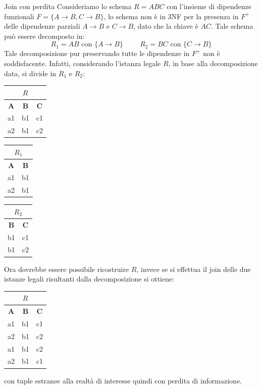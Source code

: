 \begin{Example}{Join con perdita}{}
    Consideriamo lo schema $R=ABC$ con l'insieme di dipendenze funzionali $F=\{A\to B, C\to B\}$, lo schema non è in 3NF per la presenza in $F^+$ delle dipendenze parziali $A\to B$ e $C\to B$, dato che la chiave è $AC$. Tale schema può essere decomposto in:
    \begin{equation*}
        R_1=AB\mbox{ con }\{A\to B\}\hspace{1cm}R_2=BC\mbox{ con }\{C\to B\}
    \end{equation*}
    Tale decomposizione pur preservando tutte le dipendenze in $F^+$ non è soddisfacente. Infatti, considerando l'istanza legale $R$, in base alla decomposizione data, si divide in $R_1$ e $R_2$:
     \begin{center}
        \begin{tabular}{|c|c|c|}
            \hline\multicolumn{3}{|c|}{$R$}\\\hline
            \textbf{A} & \textbf{B} & \textbf{C}\\\hline
            a1 & b1 & c1\\
            a2 & b1 & c2\\\hline
        \end{tabular}\hspace{1cm}
        \begin{tabular}{|c|c|}
            \hline\multicolumn{2}{|c|}{$R_1$}\\\hline
            \textbf{A} & \textbf{B}\\\hline
            a1 & b1\\
            a2 & b1\\\hline
        \end{tabular}
        \begin{tabular}{|c|c|}
            \hline\multicolumn{2}{|c|}{$R_2$}\\\hline
            \textbf{B} & \textbf{C}\\\hline
            b1 & c1\\
            b1 & c2\\\hline
        \end{tabular}
    \end{center}
    Ora dovrebbe essere possibile ricostruire $R$, invece se si effettua il join delle due istanze legali risultanti dalla decomposizione si ottiene:
    \begin{center}
        \begin{tabular}{|c|c|c|}
            \hline\multicolumn{3}{|c|}{$R$}\\\hline
            \textbf{A} & \textbf{B} & \textbf{C}\\\hline
            a1 & b1 & c1\\
            a2 & b1 & c2\\
            a1 & b1 & c2\\
            a2 & b1 & c1\\\hline
        \end{tabular}\hspace{1cm}
    \end{center}
    con tuple estranee alla realtà di interesse quindi con perdita di informazione.
\end{Example}

